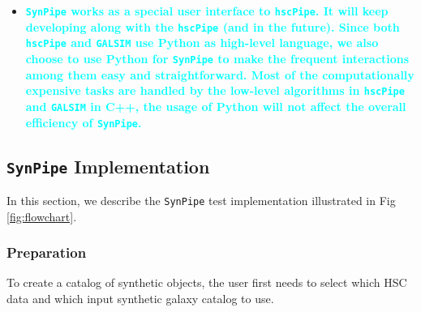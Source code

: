 \documentclass[useamsfonts]{pasj01}
\def\hscpipe{\texttt{hscPipe}}
\def\synpipe{\texttt{SynPipe}}
\def\galsim{\texttt{G}{\scriptsize \texttt{AL}}\texttt{S}{\scriptsize \texttt{IM}}}
\newcommand{\song}[1]{\textcolor{cyan} {\textbf{#1}}}
\begin{document}
\begin{itemize}
        \item \song{\synpipe{} works as a special user interface to \hscpipe{}. 
            It will keep developing along with the \hscpipe{} (and \textttt{LSSTpipe}
            in the future). 
            Since both \hscpipe{} and \galsim{} use Python as high-level language, 
            we also choose to use Python for \synpipe{} to make the frequent 
            interactions among them easy and straightforward. 
            Most of the computationally expensive tasks are handled by the low-level 
            algorithms in \hscpipe{} and \galsim{} in C++, the usage of Python will not 
            affect the overall efficiency of \synpipe{}.
            }

    \end{itemize}

\subsection{\synpipe{} Implementation }
    \label{ssec:flowchart}

    In this section, we describe the \synpipe{} test implementation illustrated in 
    Fig \ref{fig:flowchart}.

\subsubsection{Preparation}
    \label{sssec:prep}

    To create a catalog of synthetic objects, the user first needs to select which HSC 
    data and which input synthetic galaxy catalog to use. 
\end{document}
